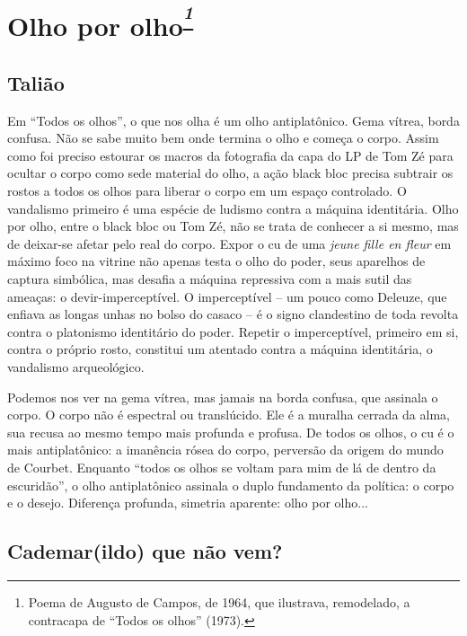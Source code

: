 \section{Olho por olho\textsuperscript{\emph{\footnote{Poema de Augusto de
  Campos, de 1964, que ilustrava, remodelado, a contracapa de ``Todos os
  olhos'' (1973).}}}}



\subsection{Talião}

Em ``Todos os olhos'', o que nos olha é um olho
antiplatônico. Gema vítrea, borda confusa. Não se sabe muito bem onde
termina o olho e começa o corpo. Assim como foi preciso estourar os
macros da fotografia da capa do LP de Tom Zé para ocultar o corpo como
sede material do olho, a ação black bloc precisa subtrair os rostos a
todos os olhos para liberar o corpo em um espaço controlado. O
vandalismo primeiro é uma espécie de ludismo contra a máquina
identitária. Olho por olho, entre o black bloc ou Tom Zé, não se trata
de conhecer a si mesmo, mas de deixar-se afetar pelo real do corpo.
Expor o cu de uma \emph{jeune fille en fleur} em máximo foco na
vitrine não apenas testa o olho do poder, seus aparelhos de captura
simbólica, mas desafia a máquina repressiva com a mais sutil das
ameaças: o devir-imperceptível. O imperceptível -- um pouco como
Deleuze, que enfiava as longas unhas no bolso do casaco -- é o signo
clandestino de toda revolta contra o platonismo identitário do poder.
Repetir o imperceptível, primeiro em si, contra o próprio rosto,
constitui um atentado contra a máquina identitária, o vandalismo
arqueológico.

Podemos nos ver na gema vítrea, mas jamais na borda confusa, que
assinala o corpo. O corpo não é espectral ou translúcido. Ele é a
muralha cerrada da alma, sua recusa ao mesmo tempo mais profunda e
profusa. De todos os olhos, o cu é o mais antiplatônico: a imanência
rósea do corpo, perversão da origem do mundo de Courbet. Enquanto
``todos os olhos se voltam para mim de lá de dentro da escuridão'', o
olho antiplatônico assinala o duplo fundamento da política: o corpo e o
desejo. Diferença profunda, simetria aparente: olho por olho...

\subsection{Cademar(ildo) que não vem?}

